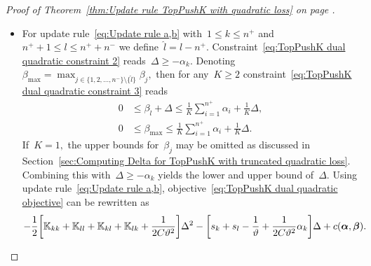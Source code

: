 \begin{proof}[Proof of Theorem~\ref{thm:Update rule TopPushK with quadratic loss} on page \pageref{thm:Update rule TopPushK with quadratic loss}]
\begin{itemize}
    \item For update rule~\eqref{eq:Update rule a,b} with~$1 \le k \le n^+$ and~$n^+ + 1 \le l \le n^+ + n^-$ we define~$\hat{l} = l - n^+.$ Constraint~\eqref{eq:TopPushK dual quadratic constraint 2} reads~$\Delta \geq - \alpha_k.$ Denoting~$\beta_{\max} = \max_{j \in \{1, 2, \ldots, n^- \} \setminus \{\hat l\}} \beta_j,$ then for any~$K \geq 2$ constraint~\eqref{eq:TopPushK dual quadratic constraint 3} reads
    \begin{equation}\label{eq: TopPushK dual quadratic a,b - bounds}
      \begin{aligned}
        0 & \leq \beta_{\hat{l}} + \Delta \leq \frac{1}{K} \sum_{i = 1}^{n^+} \alpha_i + \frac{1}{K} \Delta, \\
        0 & \leq \beta_{\max} \leq \frac{1}{K} \sum_{i = 1}^{n^+} \alpha_i + \frac{1}{K} \Delta.
      \end{aligned}
    \end{equation}
    If~$K = 1,$ the upper bounds for~$\beta_j$ may be omitted as discussed in Section~\ref{sec:Computing Delta for TopPushK with truncated quadratic loss}. Combining this with~$\Delta \geq - \alpha_k$ yields the lower and upper bound of~$\Delta.$ Using update rule~\eqref{eq:Update rule a,b}, objective~\eqref{eq:TopPushK dual quadratic objective} can be rewritten as
    \begin{equation*}
      - \frac{1}{2} \Brac[s]{\K_{kk} + \K_{ll} + \K_{kl} + \K_{lk} + \frac{1}{2C\vartheta^2}} \Delta^2 - \Brac[s]{s_k + s_l - \frac{1}{\vartheta} + \frac{1}{2C\vartheta^2} \alpha_k} \Delta + c(\bm{\alpha}, \bm{\beta}).
    \end{equation*}


\end{itemize}
\end{proof}
